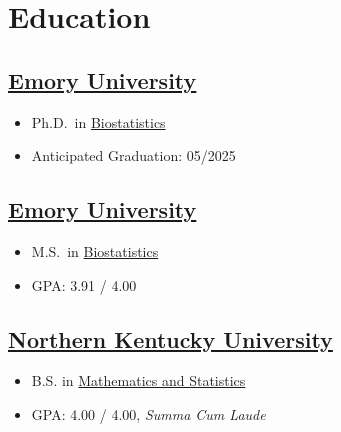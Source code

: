\section{Education}

\subsection{\href{https://www.emory.edu/home/index.html}{Emory University}} 
\vspace{-\parskip}%
\begin{itemize}[label={}]
    \item Ph.D.\ in \href{https://www.sph.emory.edu/departments/bios/degree-programs/phd/index.html}{Biostatistics}
    \item Anticipated Graduation: 05/2025
\end{itemize}

\subsection{\href{https://www.emory.edu/home/index.html}{Emory University}} 
\vspace{-\parskip}%
\begin{itemize}[label={}]
  \item M.S.\ in \href{https://www.sph.emory.edu/departments/bios/degree-programs/phd/index.html}{Biostatistics} 
  \item GPA: 3.91 / 4.00
\end{itemize}

\subsection{\href{https://www.nku.edu}{Northern Kentucky University}}
\vspace{-\parskip}%
\begin{itemize}[label={}]
  \item B.S. in \href{https://www.nku.edu/academics/artsci/about/departments/math.html}{Mathematics and Statistics}
  \item GPA: 4.00 / 4.00, \textit{Summa Cum Laude}
\end{itemize}
